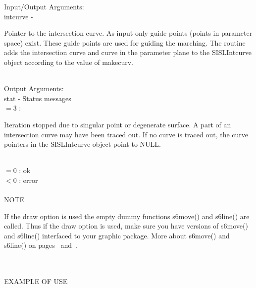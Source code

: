         \>Input/Output Arguments:\\
        \>\>    {\fov intcurve}\> - \>  \begin{minipg2}
                                Pointer to the intersection curve.
                                As input only
                                guide points (points in parameter space)
                                exist. These guide points
                                are used for guiding the marching.
                                The routine adds the
                                intersection curve and curve in the parameter
                                plane to the SISLIntcurve object according to the value
                                of makecurv.
                                \end{minipg2}\\[0.8ex]
        \>Output Arguments:\\
        \>\>    {\fov stat}     \> - \> Status messages\\
                \>\>\>\>\>      $= 3$ : \>      \begin{minipg5}
                                                Iteration stopped due to singular
                                                point or degenerate surface. A part of
                                                an intersection curve may have been
                                                traced out. If no curve is traced out,
                                                the curve pointers in the SISLIntcurve
                                                object point to NULL.
                                                \end{minipg5} \\[0.3ex]
                \>\>\>\>\>      $= 0$   :\> ok\\
                \>\>\>\>\>      $< 0$   :\> error\\
\\
NOTE\\
\>      \begin{minipg6}
If the draw option is used the empty dummy functions s6move() and
s6line() are called.
Thus if the draw option is used, make sure
you have versions of s6move() and s6line() interfaced to your graphic package.
More about s6move() and s6line() on pages~\pageref{s6move} and~\pageref{s6line}.
\end{minipg6}\\
\\ %
EXAMPLE OF USE\\
